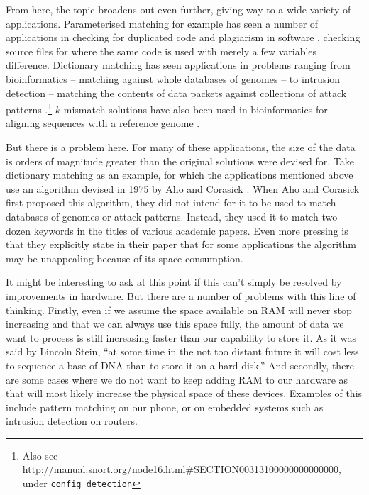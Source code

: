 \documentclass[a4paper,11pt]{article}
\begin{document}
    From here, the topic broadens out even further, giving way to a wide variety of applications. Parameterised matching for example has seen a number of applications in checking for duplicated code \cite{Baker:1993:TPP:167088.167115} and plagiarism in software \cite{Pandey:plagiarism}, checking source files for where the same code is used with merely a few variables difference. Dictionary matching has seen applications in problems ranging from bioinformatics -- matching against whole databases of genomes \cite{15713233} -- to intrusion detection -- matching the contents of data packets against collections of attack patterns \cite{1354682}.\footnote{Also see \url{http://manual.snort.org/node16.html\#SECTION00313100000000000000}, under \texttt{config detection}} $k$-mismatch solutions have also been used in bioinformatics for aligning sequences with a reference genome \cite{Tennakoon10062012}.

    But there is a problem here. For many of these applications, the size of the data is orders of magnitude greater than the original solutions were devised for. Take dictionary matching as an example, for which the applications mentioned above use an algorithm devised in 1975 by Aho and Corasick \cite{Aho:1975:ESM:360825.360855}. When Aho and Corasick first proposed this algorithm, they did not intend for it to be used to match databases of genomes or attack patterns. Instead, they used it to match two dozen keywords in the titles of various academic papers. Even more pressing is that they explicitly state in their paper that for some applications the algorithm may be unappealing because of its space consumption.

    It might be interesting to ask at this point if this can't simply be resolved by improvements in hardware. But there are a number of problems with this line of thinking. Firstly, even if we assume the space available on RAM will never stop increasing and that we can always use this space fully, the amount of data we want to process is still increasing faster than our capability to store it. As it was said by Lincoln Stein, ``at some time in the not too distant future it will cost less to sequence a base of DNA than to store it on a hard disk.'' \cite{20441614} And secondly, there are some cases where we do not want to keep adding RAM to our hardware as that will most likely increase the physical space of these devices. Examples of this include pattern matching on our phone, or on embedded systems such as intrusion detection on routers.
\end{document}
